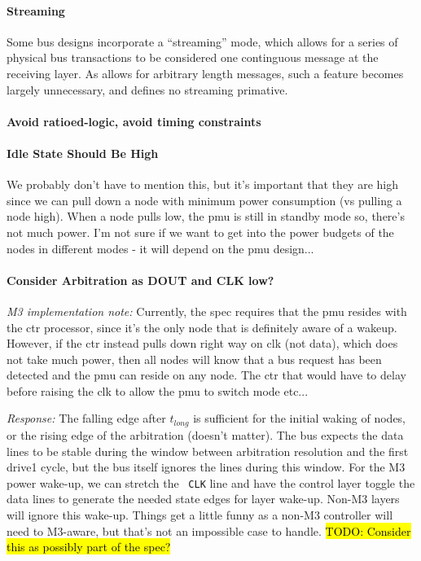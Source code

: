 \paragraph{Streaming}
Some bus designs incorporate a ``streaming'' mode, which allows for a series
of physical bus transactions to be considered one continguous message at the
receiving layer. As \bus allows for arbitrary length messages, such a feature
becomes largely unnecessary, and \bus defines no streaming primative.

\paragraph{Avoid ratioed-logic, avoid timing constraints}

\paragraph{Idle State Should Be High}
We probably don't have to mention this, but it's important that they are high
since we can pull down a node with minimum power consumption (vs pulling a
node high). When a node pulls low, the pmu is still in standby mode so,
there's not much power.  I'm not sure if we want to get into the power budgets
of the nodes in different modes - it will depend on the pmu design...

\paragraph{Consider Arbitration as DOUT and CLK low?}
\label{todo:wakeup}
{\em M3 implementation note:} Currently, the spec
requires that the pmu resides with the ctr processor, since it's the only node
that is definitely aware of a wakeup.  However, if the ctr instead pulls down
right way on clk (not data), which does not take much power, then all nodes
will know that a bus request has been detected and the pmu can reside on any
node.  The ctr that would have to delay before raising the clk to allow the
pmu to switch mode etc...

{\em Response:} The falling edge after $t_{long}$ is sufficient for the
initial waking of nodes, or the rising edge of the arbitration (doesn't
matter). The bus expects the data lines to be stable during the window between
arbitration resolution and the first {\sc drive1} cycle, but the bus itself
ignores the lines during this window. For the M3 power wake-up, we can stretch
the \bus~{\tt CLK} line and have the control layer toggle the data lines to
generate the needed state edges for layer wake-up. Non-M3 layers will ignore
this wake-up. Things get a little funny as a non-M3 controller will need to
M3-aware, but that's not an impossible case to handle. \hl{TODO: Consider this
as possibly part of the spec?}

